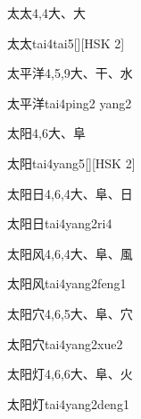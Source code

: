 \begin{entry}{太太}{4,4}{⼤、⼤}
  \begin{phonetics}{太太}{tai4tai5}[][HSK 2]
  \end{phonetics}
\end{entry}

\begin{entry}{太平洋}{4,5,9}{⼤、⼲、⽔}
  \begin{phonetics}{太平洋}{tai4ping2 yang2}
  \end{phonetics}
\end{entry}

\begin{entry}{太阳}{4,6}{⼤、⾩}
  \begin{phonetics}{太阳}{tai4yang5}[][HSK 2]
  \end{phonetics}
\end{entry}

\begin{entry}{太阳日}{4,6,4}{⼤、⾩、⽇}
  \begin{phonetics}{太阳日}{tai4yang2ri4}
  \end{phonetics}
\end{entry}

\begin{entry}{太阳风}{4,6,4}{⼤、⾩、⾵}
  \begin{phonetics}{太阳风}{tai4yang2feng1}
  \end{phonetics}
\end{entry}

\begin{entry}{太阳穴}{4,6,5}{⼤、⾩、⽳}
  \begin{phonetics}{太阳穴}{tai4yang2xue2}
  \end{phonetics}
\end{entry}

\begin{entry}{太阳灯}{4,6,6}{⼤、⾩、⽕}
  \begin{phonetics}{太阳灯}{tai4yang2deng1}
  \end{phonetics}
\end{entry}

